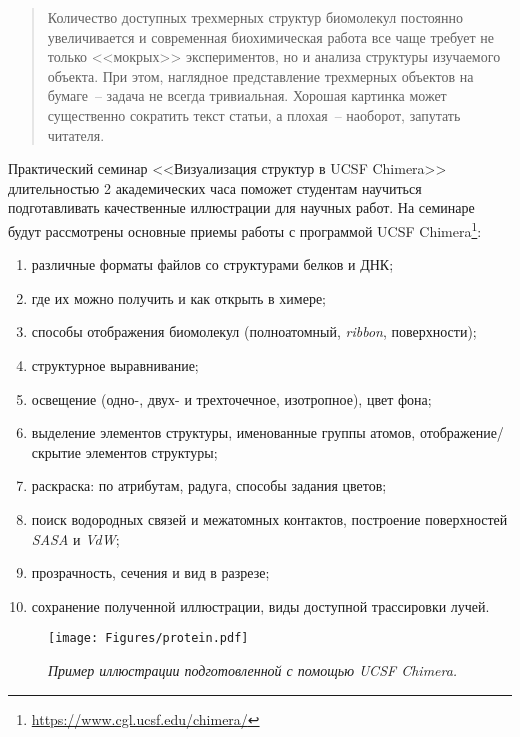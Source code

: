\begin{abstract}
Количество доступных трехмерных структур биомолекул постоянно увеличивается и современная биохимическая работа все чаще требует не только <<мокрых>> экспериментов, но и анализа структуры изучаемого объекта. При этом, наглядное представление трехмерных объектов на бумаге~-- задача не всегда тривиальная. Хорошая картинка может существенно сократить текст статьи, а плохая~-- наоборот, запутать читателя. 
\end{abstract}

Практический семинар <<Визуализация структур в UCSF Chimera>> длительностью 2 академических часа поможет студентам научиться подготавливать качественные иллюстрации для научных работ. На семинаре будут рассмотрены основные приемы работы с программой UCSF Chimera\footnote{\url{https://www.cgl.ucsf.edu/chimera/}}:
\begin{enumerate}
    \item различные форматы файлов со структурами белков и ДНК; %
    \item где их можно получить и как открыть в химере; %
    \item способы отображения биомолекул (полноатомный, \textit{ribbon}, поверхности); %
    \item структурное выравнивание;
    \item освещение (одно-, двух- и трехточечное, изотропное), цвет фона; %
    \item выделение элементов структуры, именованные группы атомов, отображение/скрытие элементов структуры;
    \item раскраска: по атрибутам, радуга, способы задания цветов; %
    \item поиск водородных связей и межатомных контактов, построение поверхностей \textit{SASA} и \textit{VdW};
    \item прозрачность, сечения и вид в разрезе;
    \item сохранение полученной иллюстрации, виды доступной трассировки лучей.
\end{enumerate}
\hfill
\begin{figure}[h!]
  \texttt{[image: Figures/protein.pdf]}
  \caption{\textit{Пример иллюстрации подготовленной с помощью UCSF Chimera.}}
  \label{fig:smug}
\end{figure}